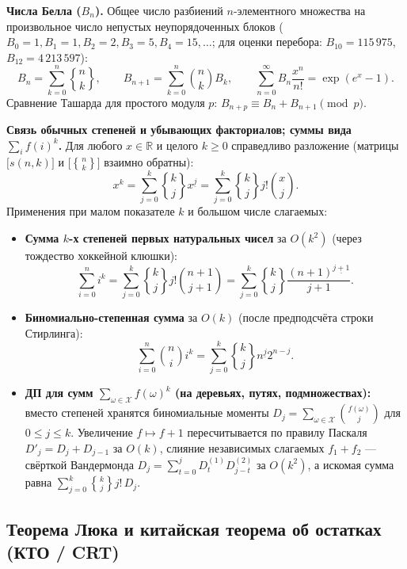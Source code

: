 \documentclass[10pt,a4paper]{article}
\renewcommand{\le}{\leqslant}
\renewcommand{\ge}{\geqslant}
\newcommand{\R}{\mathbb{R}}
\newcommand{\fall}[2]{#1^{\underline{#2}}}
\newcommand{\stirlingsecond}[2]{\genfrac{\{}{\}}{0pt}{}{#1}{#2}}
\begin{document}
\textbf{Числа Белла ($B_n$).} Общее число разбиений $n$-элементного множества на произвольное число непустых неупорядоченных блоков ($B_0 = 1, B_1 = 1, B_2 = 2, B_3 = 5, B_4 = 15, \dots$; для оценки перебора: $B_{10} = 115\,975$, $B_{12} = 4\,213\,597$):
\[
  B_n = \sum_{k=0}^{n} \stirlingsecond{n}{k}, \qquad
  B_{n + 1} = \sum_{k=0}^{n} \binom{n}{k} B_k, \qquad
  \sum_{n=0}^{\infty} B_n \frac{x^n}{n!} = \exp(e^x - 1).
\]
Сравнение Ташарда для простого модуля $p$: $B_{n + p} \equiv B_n + B_{n + 1} \pmod p$.

\textbf{Связь обычных степеней и убывающих факториалов; суммы вида $\sum_i f(i)^k$.} Для любого $x \in \R$ и целого $k \ge 0$ справедливо разложение (матрицы $\bigl[s(n, k)\bigr]$ и $\bigl[\stirlingsecond{n}{k}\bigr]$ взаимно обратны):
\[
  x^k = \sum_{j=0}^{k} \stirlingsecond{k}{j} \fall{x}{j} = \sum_{j=0}^{k} \stirlingsecond{k}{j} j! \binom{x}{j}.
\]
Применения при малом показателе $k$ и большом числе слагаемых:
\begin{itemize}
  \item \textbf{Сумма $k$-х степеней первых натуральных чисел} за $O(k^2)$ (через тождество хоккейной клюшки):
  \[
    \sum_{i=0}^{n} i^k = \sum_{j=0}^{k} \stirlingsecond{k}{j} j! \binom{n + 1}{j + 1} = \sum_{j=0}^{k} \stirlingsecond{k}{j} \frac{\fall{(n + 1)}{j + 1}}{j + 1}.
  \]
  \item \textbf{Биномиально-степенная сумма} за $O(k)$ (после предподсчёта строки Стирлинга):
  \[
    \sum_{i=0}^{n} \binom{n}{i} i^k = \sum_{j=0}^{k} \stirlingsecond{k}{j} \fall{n}{j} 2^{n - j}.
  \]
  \item \textbf{ДП для сумм $\sum_{\omega \in \mathcal{X}} f(\omega)^k$ (на деревьях, путях, подмножествах):} вместо степеней хранятся биномиальные моменты $D_j = \sum_{\omega \in \mathcal{X}} \binom{f(\omega)}{j}$ для $0 \le j \le k$. Увеличение $f \mapsto f + 1$ пересчитывается по правилу Паскаля $D'_j = D_j + D_{j-1}$ за $O(k)$, слияние независимых слагаемых $f_1 + f_2$ — свёрткой Вандермонда $D_j = \sum_{t=0}^j D^{(1)}_t D^{(2)}_{j - t}$ за $O(k^2)$, а искомая сумма равна $\sum_{j=0}^k \stirlingsecond{k}{j} j! \, D_j$.
\end{itemize}

\subsection{Теорема Люка и китайская теорема об остатках (КТО / CRT)}
\end{document}
